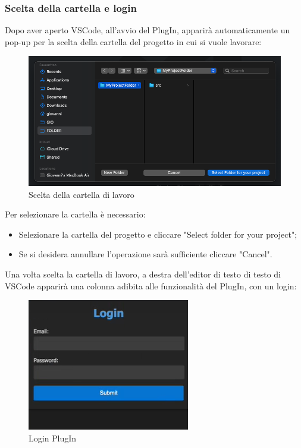\documentclass{article}
\begin{document}
\subsubsection{Scelta della cartella e login}
Dopo aver aperto VSCode, all'avvio del PlugIn, apparirà automaticamente un pop-up per la scelta della cartella del progetto in cui si vuole lavorare:
    \begin{figure}[H]
      \centering
      \includegraphics[width=\textwidth]{documenti/Screenshot manuale utente/folder-selection.png}
      \caption{Scelta della cartella di lavoro}
      \label{feedback}
    \end{figure}
    Per selezionare la cartella è necessario:
    \begin{itemize}
        \item Selezionare la cartella del progetto e cliccare "Select folder for your project";
        \item Se si desidera annullare l'operazione sarà sufficiente cliccare "Cancel".
    \end{itemize}
Una volta scelta la cartella di lavoro, a destra dell'editor di testo di testo di VSCode apparirà una colonna adibita alle funzionalità del PlugIn, con un login:
    \begin{figure}[H]
      \centering
      \includegraphics{documenti/Screenshot manuale utente/ban plugin.png}
      \caption{Login PlugIn}
      \label{loginplugin}
    \end{figure}
\end{document}
